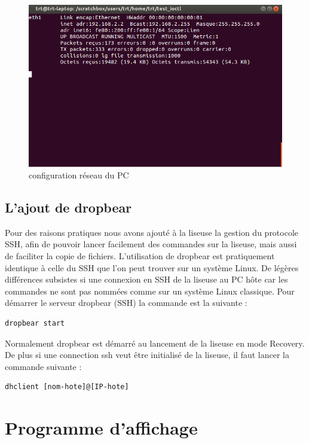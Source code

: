 \begin{figure}[]
	\begin{center}
		\includegraphics[scale=0.5]{capt_pc_ifconfig.png}
	\end{center}
	\caption{configuration réseau du PC}
\end{figure}
\clearpage
\subsection{L'ajout de dropbear}
Pour des raisons pratiques nous avons ajouté à la liseuse la gestion du protocole SSH, afin de pouvoir lancer facilement des commandes sur la liseuse, mais aussi de faciliter la copie de fichiers.
L'utilisation de dropbear est pratiquement identique à celle du SSH que l'on peut trouver sur un système Linux. De légères différences subsistes si une connexion en SSH de la liseuse au PC hôte car les commandes ne sont pas nommées comme sur un système Linux classique. Pour démarrer le serveur dropbear (SSH) la commande est la suivante : 

\begin{lstlisting}
dropbear start
\end{lstlisting}

Normalement dropbear est démarré au lancement de la liseuse en mode Recovery. De plus si une connection ssh veut être initialisé de la liseuse, il faut lancer la commande suivante :

\begin{lstlisting}
dhclient [nom-hote]@[IP-hote]
\end{lstlisting}



\section{Programme d'affichage}

